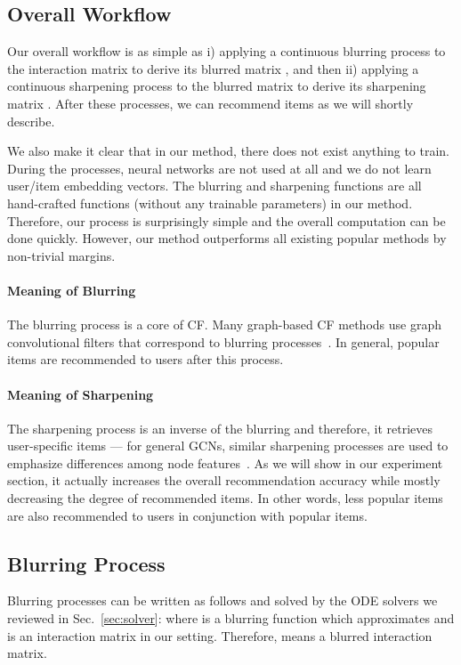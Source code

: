 \documentclass[sigconf,natbib=true]{acmart}
\begin{document}
\subsection{Overall Workflow}\label{sec:overall}
Our overall workflow is as simple as i) applying a continuous blurring process to the interaction matrix  to derive its blurred matrix , and then ii) applying a continuous sharpening process to the blurred matrix to derive its sharpening matrix . After these processes, we can recommend items as we will shortly describe.

We also make it clear that in our method, there does not exist anything to train. During the processes, neural networks are not used at all and we do not learn user/item embedding vectors. The blurring and sharpening functions are all hand-crafted functions (without any trainable parameters) in our method. Therefore, our process is surprisingly simple and the overall computation can be done quickly. However, our method outperforms all existing popular methods by non-trivial margins.

\paragraph{Meaning of Blurring} The blurring process is a core of CF. Many graph-based CF methods use graph convolutional filters that correspond to blurring processes~\cite{He20LightGCN,Shen21GFCF,balcilar2021analyzing}. In general, popular items are recommended to users after this process.

\paragraph{Meaning of Sharpening} The sharpening process is an inverse of the blurring and therefore, it retrieves user-specific items --- for general GCNs, similar sharpening processes are used to emphasize differences among node features~\cite{Bo2021fagcn,chien2021GPRGNN}. As we will show in our experiment section, it actually increases the overall recommendation accuracy while mostly decreasing the degree of recommended items. In other words, less popular items are also recommended to users in conjunction with popular items.

\subsection{Blurring Process}
Blurring processes can be written as follows and solved by the ODE solvers we reviewed in Sec.~\ref{sec:solver}:
where  is a blurring function which approximates  and  is an interaction matrix  in our setting. Therefore,  means a blurred interaction matrix.
\end{document}
